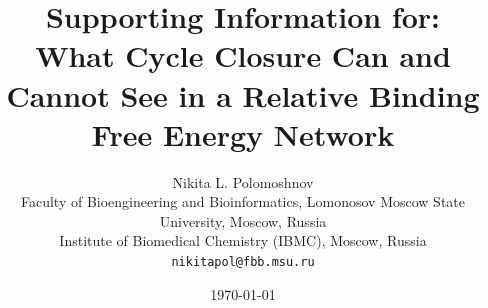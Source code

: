 \documentclass[11pt]{article}
\title{\bf Supporting Information for:\\
What Cycle Closure Can and Cannot See in a Relative Binding Free Energy Network}
\author{Nikita L. Polomoshnov\\
\small Faculty of Bioengineering and Bioinformatics, Lomonosov Moscow State University, Moscow, Russia\\
\small Institute of Biomedical Chemistry (IBMC), Moscow, Russia\\
\small \texttt{nikitapol@fbb.msu.ru}}
\date{\today}
\theoremstyle{plain}
\theoremstyle{remark}
\begin{document}
\maketitle

\renewcommand{\thepage}{S\arabic{page}}
\renewcommand{\thefigure}{S\arabic{figure}}
\renewcommand{\thetable}{S\arabic{table}}
\renewcommand{\thesection}{S\arabic{section}}
\renewcommand{\thetheorem}{S\arabic{theorem}}
\setcounter{page}{1}



\clearpage


\end{document}
